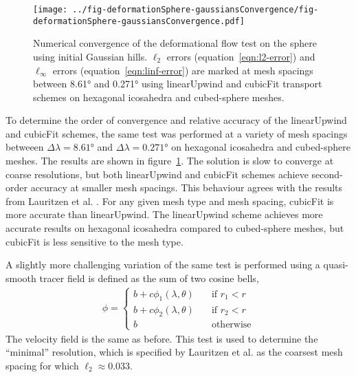 \begin{figure}
	\centering
	\texttt{[image: ../fig-deformationSphere-gaussiansConvergence/fig-deformationSphere-gaussiansConvergence.pdf]}
%
	\caption{Numerical convergence of the deformational flow test on the sphere using initial Gaussian hills.  $\ell_2$ errors (equation~\ref{eqn:l2-error}) and $\ell_\infty$ errors (equation~\ref{eqn:linf-error}) are marked at mesh spacings between \ang{8.61} and \ang{0.271} using linearUpwind and cubicFit transport schemes on hexagonal icosahedra and cubed-sphere meshes.}
	\label{fig:deformationSphere-gaussian-convergence}
\end{figure}

To determine the order of convergence and relative accuracy of the linearUpwind and cubicFit schemes, the same test was performed at a variety of mesh spacings betweeen $\Delta \lambda = \ang{8.61}$ and $\Delta \lambda = \ang{0.271}$ on hexagonal icosahedra and cubed-sphere meshes.  The results are shown in figure~\ref{fig:deformationSphere-gaussian-convergence}.
The solution is slow to converge at coarse resolutions, but both linearUpwind and cubicFit schemes achieve second-order accuracy at smaller mesh spacings.  This behaviour agrees with the results from Lauritzen et al. \citep{lauritzen2012}.  For any given mesh type and mesh spacing, cubicFit is more accurate than linearUpwind.  The linearUpwind scheme achieves more accurate results on hexagonal icosahedra compared to cubed-sphere meshes, but cubicFit is less sensitive to the mesh type.

A slightly more challenging variation of the same test is performed using a quasi-smooth tracer field is defined as the sum of two cosine bells,
\begin{align}
	\phi =
	\begin{cases}
		b + c \phi_1(\lambda, \theta) & \quad \text{if $r_1 < r$} \\
		b + c \phi_2(\lambda, \theta) & \quad \text{if $r_2 < r$} \\
		b			      & \quad \text{otherwise}
	\end{cases}
\end{align}
The velocity field is the same as before.  This test is used to determine the ``minimal'' resolution, which is specified by Lauritzen et al. \citep{lauritzen2012} as the coarsest mesh spacing for which $\ell_2 \approx 0.033$.

